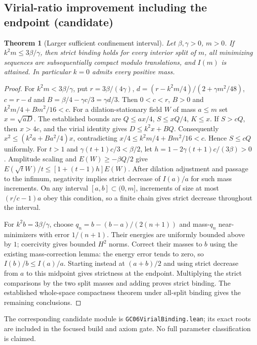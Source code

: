 \documentclass[11pt]{article}
\numberwithin{equation}{section}
\newtheorem{theorem}{Theorem}[section]
\theoremstyle{remark}
\begin{document}
\subsection{Virial-ratio improvement including the endpoint (candidate)}

\begin{theorem}[Larger sufficient confinement interval]
Let $\beta,\gamma>0$, $m>0$. If $k^2m\le 3\beta/\gamma$, then
strict binding holds for every interior split of $m$, all minimizing
sequences are subsequentially compact modulo translations, and $I(m)$
is attained. In particular $k=0$ admits every positive mass.
\end{theorem}

\begin{proof}
For $k^2m<3\beta/\gamma$, put $r=3\beta/(4\gamma)$,
$d=(r-k^2m/4)/(2+\gamma m^2/48)$, $c=r-d$ and
$B=\beta/4-\gamma c/3=\gamma d/3$. Then $0<c<r$, $B>0$ and
$k^2m/4+B m^2/16<c$. For a dilation-stationary field $W$ of
mass $a\le m$ set $x=\sqrt{aD}$. The established bounds are
$Q\le ax/4$, $S\le xQ/4$, $K\le x$. If $S>cQ$, then $x>4c$,
and the virial identity gives $D\le k^2x+BQ$. Consequently
$x^2\le(k^2a+B a^2/4)x$, contradicting
$x/4\le k^2m/4+B m^2/16<c$. Hence $S\le cQ$ uniformly.
For $t>1$ and $\gamma(t+1)c/3<\beta/2$, let
$h=1-2\gamma(t+1)c/(3\beta)>0$. Amplitude scaling and
$E(W)\ge-\beta Q/2$ give
$E(\sqrt{t}W)/t\le[1+(t-1)h]E(W)$.
After dilation adjustment and passage to the infimum, negativity
implies strict decrease of $I(a)/a$ for such mass increments.
On any interval $[a,b]\subset(0,m]$, increments of size at most
$(r/c-1)a$ obey this condition, so a finite chain gives strict decrease
throughout the interval.

For $k^2b=3\beta/\gamma$, choose
$q_n=b-(b-a)/(2(n+1))$ and mass-$q_n$ near-minimizers with error
$1/(n+1)$. Their energies are uniformly bounded above by $1$;
coercivity gives bounded $H^2$ norms. Correct their masses to $b$
using the existing mass-correction lemma: the energy error tends to
zero, so $I(b)/b\le I(a)/a$. Starting instead at $(a+b)/2$ and
using strict decrease from $a$ to this midpoint gives strictness
at the endpoint. Multiplying the strict comparisons by the two
split masses and adding proves strict binding. The established
whole-space compactness theorem under all-split binding gives the
remaining conclusions.
\end{proof}

The corresponding candidate module is \texttt{GC06VirialBinding.lean};
its exact roots are included in the focused build and axiom gate.
No full parameter classification is claimed.
\end{document}
